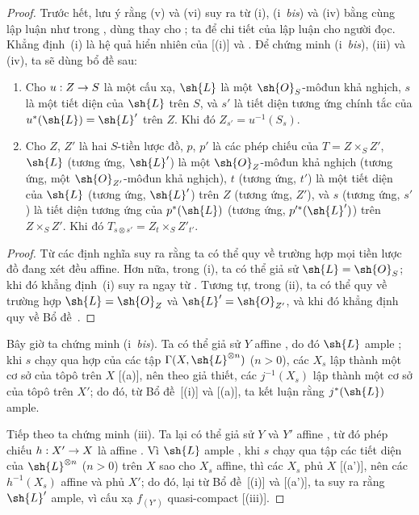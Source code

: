 \documentclass[oneside,10pt]{amsart}
\makeatletter
\newcommand{\ega@arrow}[2]{\mathchoice{#1}{#2}{#2}{#2}}
\renewcommand{\to}{\ega@arrow{\longrightarrow}{\rightarrow}}
\let\EGAOriginalLabel\label
\renewcommand{\label}[1]{\phantomsection\EGAOriginalLabel{#1}}
\makeatother
\begin{document}
\begin{proof}
Trước hết, lưu ý rằng (v) và (vi) suy ra từ (i), (i~\emph{bis}) và (iv) bằng cùng lập luận như trong , dùng  thay cho ;
ta để chi tiết của lập luận cho người đọc.
Khẳng định~(i) là hệ quả hiển nhiên của [(i)] và .
Để chứng minh (i~\emph{bis}), (iii) và (iv), ta sẽ dùng bổ đề sau:
  \begin{lemma}[4.6.13.1]
  \label{II.4.6.13.1}
  \begin{enumerate}
    \item[\rm{(i)}] Cho $u:Z\to S$ là một cấu xạ, $\sh{L}$ là một $\sh{O}_S$-môđun khả nghịch, $s$ là một tiết diện của $\sh{L}$ trên $S$, và $s'$ là tiết diện tương ứng chính tắc của $u^*(\sh{L})=\sh{L}'$ trên $Z$.
      Khi đó $Z_{s'}=u^{-1}(S_s)$.
    \item[\rm{(ii)}] Cho $Z$, $Z'$ là hai $S$-tiền lược đồ, $p$, $p'$ là các phép chiếu của $T=Z\times_S Z'$, $\sh{L}$ (tương ứng, $\sh{L}'$) là một $\sh{O}_Z$-môđun khả nghịch (tương ứng, một $\sh{O}_{Z'}$-môđun khả nghịch), $t$ (tương ứng, $t'$) là một tiết diện của $\sh{L}$ (tương ứng, $\sh{L}'$) trên $Z$ (tương ứng, $Z'$), và $s$ (tương ứng, $s'$) là tiết diện tương ứng của $p^*(\sh{L})$ (tương ứng, $p'^*(\sh{L}')$) trên $Z\times_S Z'$.
      Khi đó $T_{s\otimes s'}=Z_t\times_S Z'_{t'}$.
  \end{enumerate}
  \end{lemma}

  \begin{proof}
  Từ các định nghĩa suy ra rằng ta có thể quy về trường hợp mọi tiền lược đồ đang xét đều affine.
  Hơn nữa, trong (i), ta có thể giả sử $\sh{L}=\sh{O}_S$;
  khi đó khẳng định~(i) suy ra ngay từ .
  Tương tự, trong (ii), ta có thể quy về trường hợp $\sh{L}=\sh{O}_Z$ và $\sh{L}'=\sh{O}_{Z'}$, và khi đó khẳng định quy về Bổ đề~.
  \end{proof}

Bây giờ ta chứng minh (i~\emph{bis}).
Ta có thể giả sử $Y$ affine , do đó $\sh{L}$ ample ;
khi $s$ chạy qua hợp của các tập $\Gamma(X,\sh{L}^{\otimes n})$ ($n>0$), các $X_s$ lập thành một cơ sở của tôpô trên $X$ [(a)], nên theo giả thiết, các $j^{-1}(X_s)$ lập thành một cơ sở của tôpô trên $X'$;
do đó, từ Bổ đề~[(i)] và [(a)], ta kết luận rằng $j^*(\sh{L})$ ample.

Tiếp theo ta chứng minh (iii).
Ta lại có thể giả sử $Y$ và $Y'$ affine , từ đó phép chiếu $h:X'\to X$ là affine .
Vì $\sh{L}$ ample , khi $s$ chạy qua tập các tiết diện của $\sh{L}^{\otimes n}$ ($n>0$) trên $X$ sao cho $X_s$ affine, thì các $X_s$ phủ $X$ [(a')], nên các $h^{-1}(X_s)$ affine  và phủ $X'$;
do đó, lại từ Bổ đề~[(i)] và [(a')], ta suy ra rằng $\sh{L}'$ ample, vì cấu xạ $f_{(Y')}$ quasi-compact [(iii)].


\end{proof}
\end{document}
